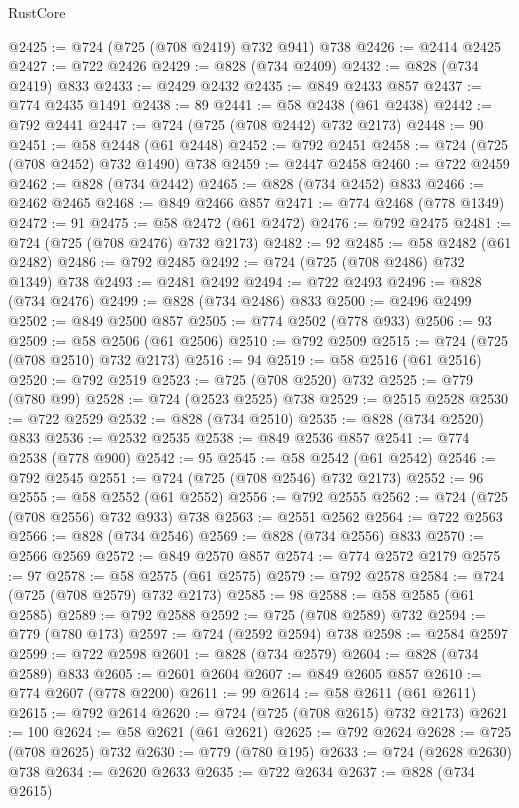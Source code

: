 \begin{lexlean}{RustCore}
\begin{coremodule}
@2425 := @724 (@725 (@708 @2419) @732 @941) @738
@2426 := @2414 @2425
@2427 := @722 @2426
@2429 := @828 (@734 @2409)
@2432 := @828 (@734 @2419) @833
@2433 := @2429 @2432
@2435 := @849 @2433 @857
@2437 := @774 @2435 @1491
@2438 := 89
@2441 := @58 @2438 (@61 @2438)
@2442 := @792 @2441
@2447 := @724 (@725 (@708 @2442) @732 @2173)
@2448 := 90
@2451 := @58 @2448 (@61 @2448)
@2452 := @792 @2451
@2458 := @724 (@725 (@708 @2452) @732 @1490) @738
@2459 := @2447 @2458
@2460 := @722 @2459
@2462 := @828 (@734 @2442)
@2465 := @828 (@734 @2452) @833
@2466 := @2462 @2465
@2468 := @849 @2466 @857
@2471 := @774 @2468 (@778 @1349)
@2472 := 91
@2475 := @58 @2472 (@61 @2472)
@2476 := @792 @2475
@2481 := @724 (@725 (@708 @2476) @732 @2173)
@2482 := 92
@2485 := @58 @2482 (@61 @2482)
@2486 := @792 @2485
@2492 := @724 (@725 (@708 @2486) @732 @1349) @738
@2493 := @2481 @2492
@2494 := @722 @2493
@2496 := @828 (@734 @2476)
@2499 := @828 (@734 @2486) @833
@2500 := @2496 @2499
@2502 := @849 @2500 @857
@2505 := @774 @2502 (@778 @933)
@2506 := 93
@2509 := @58 @2506 (@61 @2506)
@2510 := @792 @2509
@2515 := @724 (@725 (@708 @2510) @732 @2173)
@2516 := 94
@2519 := @58 @2516 (@61 @2516)
@2520 := @792 @2519
@2523 := @725 (@708 @2520) @732
@2525 := @779 (@780 @99)
@2528 := @724 (@2523 @2525) @738
@2529 := @2515 @2528
@2530 := @722 @2529
@2532 := @828 (@734 @2510)
@2535 := @828 (@734 @2520) @833
@2536 := @2532 @2535
@2538 := @849 @2536 @857
@2541 := @774 @2538 (@778 @900)
@2542 := 95
@2545 := @58 @2542 (@61 @2542)
@2546 := @792 @2545
@2551 := @724 (@725 (@708 @2546) @732 @2173)
@2552 := 96
@2555 := @58 @2552 (@61 @2552)
@2556 := @792 @2555
@2562 := @724 (@725 (@708 @2556) @732 @933) @738
@2563 := @2551 @2562
@2564 := @722 @2563
@2566 := @828 (@734 @2546)
@2569 := @828 (@734 @2556) @833
@2570 := @2566 @2569
@2572 := @849 @2570 @857
@2574 := @774 @2572 @2179
@2575 := 97
@2578 := @58 @2575 (@61 @2575)
@2579 := @792 @2578
@2584 := @724 (@725 (@708 @2579) @732 @2173)
@2585 := 98
@2588 := @58 @2585 (@61 @2585)
@2589 := @792 @2588
@2592 := @725 (@708 @2589) @732
@2594 := @779 (@780 @173)
@2597 := @724 (@2592 @2594) @738
@2598 := @2584 @2597
@2599 := @722 @2598
@2601 := @828 (@734 @2579)
@2604 := @828 (@734 @2589) @833
@2605 := @2601 @2604
@2607 := @849 @2605 @857
@2610 := @774 @2607 (@778 @2200)
@2611 := 99
@2614 := @58 @2611 (@61 @2611)
@2615 := @792 @2614
@2620 := @724 (@725 (@708 @2615) @732 @2173)
@2621 := 100
@2624 := @58 @2621 (@61 @2621)
@2625 := @792 @2624
@2628 := @725 (@708 @2625) @732
@2630 := @779 (@780 @195)
@2633 := @724 (@2628 @2630) @738
@2634 := @2620 @2633
@2635 := @722 @2634
@2637 := @828 (@734 @2615)

\end{coremodule}
\end{lexlean}
